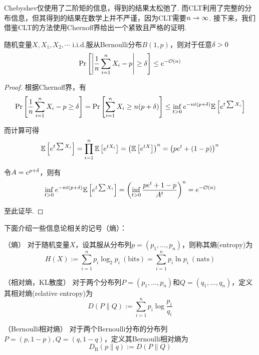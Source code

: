 Chebyshev仅使用了二阶矩的信息，得到的结果太松弛了. 而CLT利用了完整的分布信息，但其得到的结果在数学上并不严谨，因为CLT需要$n \rightarrow \infty$. 接下来，我们借鉴CLT的方法使用Chernoff界给出一个紧致且严格的证明. 

\begin{theorem} \label{thm:bernoulli}
    随机变量$X, X_1, X_2, \cdots$ i.i.d.服从Bernoulli分布$B(1,p)$，则对于任意$\delta > 0$ 
    \[
    \Pr\left[
        \left\vert
            \dfrac 1n \sum_{i=1}^n X_i - p
        \right\vert \ge \delta
    \right] \le e^{-\mathcal{O} (n)}
    \]
\end{theorem}
\begin{proof}
    根据Chernoff界，有 
    \[
    \Pr\left[
        \dfrac 1n \sum_{i=1}^n X_i - p \ge \delta
    \right] = \Pr \left[
        \sum_{i=1}^n X_i \ge n(p + \delta)
    \right] \le \inf_{t > 0} e^{-nt(p + \delta)} \mathbb{E}\left[e^{t\sum X_i}\right]
    \]

    而计算可得
    \[
    \mathbb{E}\left[
        e^{t \sum X_i}
    \right] = \prod_{i=1}^n \mathbb{E}\left[
        e^{tX_i}
    \right] = {\left(
        \mathbb{E}\left[
            e^{tX}
        \right]
    \right)}^n = {\left(
        p e^t + (1-p)
    \right)}^n
    \]

    令$A = e^{p + \delta}$，则有
    \[
    \inf_{t > 0} e^{-nt(p + \delta)} \mathbb{E}\left[e^{t\sum X_i}\right] = {\left(
        \inf_{t > 0} \dfrac{pe^t + 1-p}{A^t}
    \right)}^n = e^{-\mathcal{O} (n)}
    \]

    至此证毕.
\end{proof}

下面介绍一些信息论相关的记号（熵）：
\begin{definition} （熵）
    对于随机变量$X$，设其服从分布列$p=(p_1, \dots, p_n)$，则称其熵(entropy)为 
    \[
    H(X) := \sum_{i=1}^n p_i \log_2 p_i \ (\mathrm{bits}) = \sum_{i=1}^n p_i \ln p_i \ (\mathrm{nats})
    \]
\end{definition}

\begin{definition}（相对熵，KL散度）
    对于两个分布列$P = (p_1, \dots, p_n)$和$Q = (q_1, \dots, q_n)$，定义其相对熵(relative entropy)为 
    \[
    D(P\|Q) := \sum_{i=1}^n p_i \log \dfrac{p_i}{q_i}
    \]
\end{definition}

\begin{definition}（Bernoulli相对熵）
    对于两个Bernoulli分布的分布列$P=(p, 1-p), Q=(q, 1-q)$，定义其Bernoulli相对熵为 
    \[
    D_{\mathrm{B}}(p\|q) := D(P\| Q)
    \]
\end{definition}


